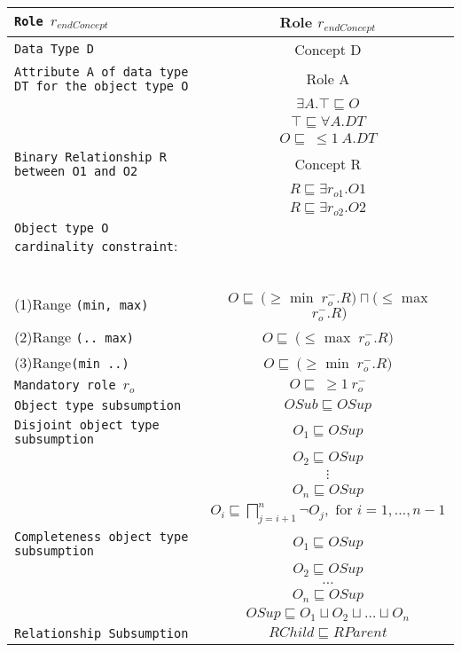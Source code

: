 \documentclass[sn-mathphys]{sn-jnl}
\begin{document}
{{{{\begin{table}[h]
\begin{tabular}{|l|c|}
{\tt Role $r_{endConcept}$ } &   Role $r_{endConcept}$\\ \hline
{\tt Data Type D }&Concept D\\
\hline
{\tt Attribute A of data type DT for the object type O }
&Role A\\
&$\exists A.\top \sqsubseteq O$\\
&$\top \sqsubseteq \forall A.DT$\\
&$O \sqsubseteq \ \leq 1 \ A.DT $\\
\hline
{\tt Binary Relationship R between O1 and O2}
& Concept R \\
&$R \sqsubseteq \exists r_{o1}.O1$\\
&$R \sqsubseteq \exists r_{o2}.O2$\\
\hline
{\tt Object type O cardinality constraint}:&\\
\ \ &\\
(1)Range {\tt (min, max) }&  $O \sqsubseteq \ (\geq $ min $ \ r_{o}^{-}.R) \sqcap (\leq $ max $ \ r_{o}^{-}.R)$\\\hdashline
(2)Range {\tt (.. max) }&  $O \sqsubseteq \  (\leq $ max $ \ r_{o}^{-}.R)$\\\hdashline
(3)Range{\tt (min ..) }&  $O \sqsubseteq \ (\geq $ min $ \ r_{o}^{-}.R) $\\\hline
{\tt Mandatory role $r_o$}&$O \sqsubseteq \ \geq 1\ r_o^{-} $\\\hline
{\tt Object type  subsumption}&$OSub \sqsubseteq OSup$\\\hline
{\tt  Disjoint object type subsumption}&
$O_1 \sqsubseteq OSup$\\
&$O_2 \sqsubseteq OSup$\\
&$\vdots$\\
&$O_n \sqsubseteq OSup$\\
&$O_i\sqsubseteq \bigsqcap_{j=i+1}^n \neg O_j, \mbox{ for }i =1, \ldots, n-1$\\\hline
{\tt  Completeness object type subsumption}& $O_1 \sqsubseteq OSup$\\
&$O_2 \sqsubseteq OSup$\\
& 
$\ldots$\\
&
$O_n \sqsubseteq OSup$\\
&$OSup \sqsubseteq O_1 \sqcup O_2 \sqcup \ldots \sqcup O_n$
\\\hline
{\tt Relationship Subsumption}&$RChild \sqsubseteq RParent$\\
\hline
    \end{tabular}
    

\end{table}}}}}
\end{document}
